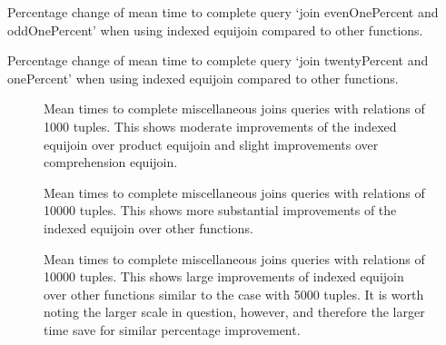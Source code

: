 \begin{table}[p]
    \centering
    
    \caption{Percentage change of mean time to complete query `join evenOnePercent and oddOnePercent' when using indexed equijoin compared to other functions.}
    \label{tab:percentage-change-of-means-join-evenOnePercent-and-oddOnePercent}
\end{table}

\begin{table}[p]
    \centering
    
    \caption{Percentage change of mean time to complete query `join twentyPercent and onePercent' when using indexed equijoin compared to other functions.}
    \label{tab:percentage-change-of-means-join-twentyPercent-and-onePercent}
\end{table}

\begin{figure}[p]
    
    \caption{Mean times to complete miscellaneous joins queries with relations
    of 1000 tuples. This shows moderate improvements of the indexed equijoin
over product equijoin and slight improvements over comprehension equijoin.}
    \label{fig:non-standard-1000}
\end{figure}

\begin{figure}[p]
    
    \caption{Mean times to complete miscellaneous joins queries with relations
    of 10000 tuples. This shows more substantial improvements of the indexed
equijoin over other functions.}
    \label{fig:non-standard-5000}
\end{figure}

\begin{figure}[p]
    
    \caption{Mean times to complete miscellaneous joins queries with relations
    of 10000 tuples. This shows large improvements of indexed equijoin over
other functions similar to the case with 5000 tuples. It is worth noting the
larger scale in question, however, and therefore the larger time save for
similar percentage improvement.}
    \label{fig:non-standard-10000}
\end{figure}

